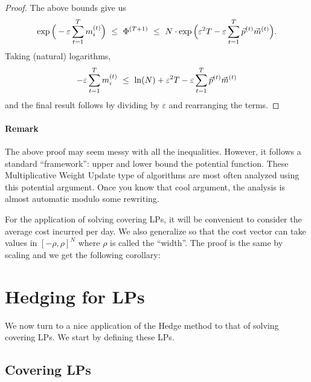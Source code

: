 \begin{proof}
The above bounds give us
\[
  \exp\Big(-\varepsilon\sum_{t=1}^T m_i^{(t)}\Big)\ \le\ \Phi^{(T+1)}\ \le\
  N\cdot\exp\Big(\varepsilon^2T-\varepsilon\sum_{t=1}^T\vp^{(t)}\vm^{(t)}\Big).
\]
Taking (natural) logarithms,
\[
  -\varepsilon\sum_{t=1}^T m_i^{(t)}\ \le\ \ln(N)+\varepsilon^2T-\varepsilon\sum_{t=1}^T\vp^{(t)}\vm^{(t)}
\]
and the final result follows by dividing by $\varepsilon$ and rearranging the terms.
\end{proof}

\paragraph{Remark} The above proof may seem messy with all the inequalities. However, it follows a
standard ``framework'': upper and lower bound the potential function. These Multiplicative Weight
Update type of algorithms are most often analyzed using this potential argument. Once you know that
cool argument, the analysis is almost automatic modulo some rewriting.

For the application of solving covering LPs, it will be convenient to consider the average cost
incurred per day. We also generalize so that the cost vector can take values in $[-\rho,\rho]^N$
where $\rho$ is called the ``width''. The proof is the same by scaling and we get the following
corollary:

\label{cor:hedge}

\section{Hedging for LPs}
\label{sec:hedglp}
We now turn to a nice application of the Hedge method to that of solving covering LPs. We start by
defining these LPs.

\subsection{Covering LPs}


